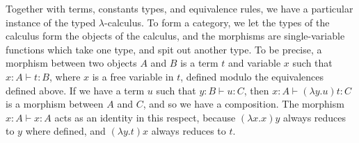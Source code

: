 \documentclass{article}
\theoremstyle{plain}
\begin{document}
Together with terms, constants types, and equivalence rules, we have a particular instance of the typed $\lambda$-calculus. To form a category, we let the types of the calculus form the objects of the calculus, and the morphisms are single-variable functions which take one type, and spit out another type. To be precise, a morphism between two objects $A$ and $B$ is a term $t$ and variable $x$ such that $x: A \vdash t: B$, where $x$ is a free variable in $t$, defined modulo the equivalences defined above. If we have a term $u$ such that $y: B \vdash u:C$, then $x:A \vdash (\lambda y.u)t: C$ is a morphism between $A$ and $C$, and so we have a composition. The morphism $x: A \vdash x:A$ acts as an identity in this respect, because $(\lambda x.x)y$ always reduces to $y$ where defined, and $(\lambda y.t)x$ always reduces to $t$.
\end{document}
